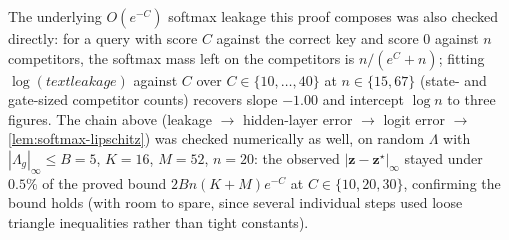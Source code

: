 The underlying $O(e^{-C})$ softmax leakage this proof composes was also
checked directly: for a query with score $C$ against the correct key and
score $0$ against $n$ competitors, the softmax mass left on the
competitors is $n/(e^C+n)$; fitting $\log(text{leakage})$ against $C$ over
$C\in\{10,\dots,40\}$ at $n\in\{15,67\}$ (state- and gate-sized competitor
counts) recovers slope $-1.00$ and intercept $\log n$ to three figures.
The chain above (leakage $\to$ hidden-layer error $\to$ logit error $\to$
\cref{lem:softmax-lipschitz}) was checked numerically as well, on random
$\Lambda$ with $|\Lambda_g|_\infty\le B=5$, $K=16$, $M=52$, $n=20$: the observed
$|\bm z-\bm z^\star|_\infty$ stayed under $0.5\%$ of the proved bound
$2Bn(K+M)e^{-C}$ at $C\in\{10,20,30\}$, confirming the bound holds (with
room to spare, since several individual steps used loose triangle
inequalities rather than tight constants).

